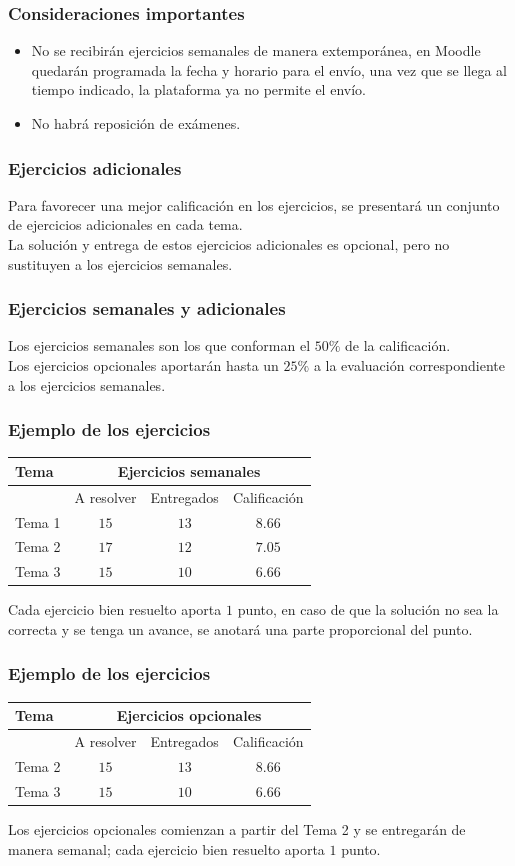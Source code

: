 \begin{frame}
\frametitle{Consideraciones importantes}
\begin{itemize}
\setlength{\itemsep}{0mm}
\item No se recibirán ejercicios semanales de manera extemporánea, en Moodle quedarán programada la fecha y horario para el envío, una vez que se llega al tiempo indicado, la plataforma ya no permite el envío.
\item No habrá reposición de exámenes.
\end{itemize}
\end{frame}
\begin{frame}
\frametitle{Ejercicios adicionales}
Para favorecer una mejor calificación en los ejercicios, se presentará un conjunto de ejercicios adicionales en cada tema.
\\
\bigskip
\pause
La solución y entrega de estos ejercicios adicionales es opcional, pero no sustituyen a los ejercicios semanales.
\end{frame}
\begin{frame}
\frametitle{Ejercicios semanales y adicionales}
Los ejercicios semanales son los que conforman el $50\%$ de la calificación.
\\
\bigskip
\pause
Los ejercicios opcionales aportarán hasta un $25\%$ a la evaluación correspondiente a los ejercicios semanales.
\end{frame}
\begin{frame}
\frametitle{Ejemplo de los ejercicios}
\fontsize{12}{12}\selectfont
\begin{table}
\begin{tabular}{l c c c }
Tema & \multicolumn{3}{c}{Ejercicios semanales} \\ \hline
& A resolver & Entregados & Calificación \\
Tema 1 & $15$ & $13$ & $8.66$ \\ \hline
Tema 2 & $17$ & $12$ & $7.05$ \\ \hline
Tema 3 & $15$ & $10$ & $6.66$ \\ \hline
\end{tabular}
\end{table}
\pause
\medskip
Cada ejercicio bien resuelto aporta $1$ punto, en caso de que la solución no sea la correcta y se tenga un avance, se anotará una parte proporcional del punto.
\end{frame}
\begin{frame}
\frametitle{Ejemplo de los ejercicios}
\fontsize{12}{12}\selectfont
\begin{table}
\begin{tabular}{l c c c }
Tema & \multicolumn{3}{c}{Ejercicios opcionales} \\ \hline
& A resolver & Entregados & Calificación \\
Tema 2 & $15$ & $13$ & $8.66$ \\ \hline
Tema 3 & $15$ & $10$ & $6.66$ \\ \hline
\end{tabular}
\end{table}
\pause
\medskip
Los ejercicios opcionales comienzan a partir del Tema 2 y se entregarán de manera semanal; cada ejercicio bien resuelto aporta $1$ punto.
\end{frame}
